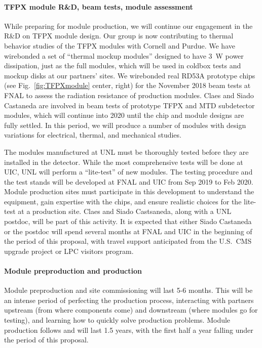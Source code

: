 \paragraph{TFPX module R\&D, beam tests, module assessment}
While preparing for module production, we will continue our engagement in the R\&D on TFPX module design. Our group is now contributing to thermal behavior studies of the TFPX modules with Cornell and Purdue. We have wirebonded a set of ``thermal mockup modules'' designed to have 3~W power dissipation, just as the full modules, which will be used in coldbox tests and mockup disks at our partners' sites. We wirebonded real RD53A prototype chips (see Fig.~\ref{fig:TFPXmodule} center, right) for the November 2018 beam tests at FNAL to assess the radiation resistance of production modules.  
Claes and Siado Castaneda are involved in beam tests of prototype TFPX and MTD subdetector modules, which will continue into 2020 until the chip and module designs are fully settled. In this period, we will produce a number of modules with design variations for electrical, thermal, and mechanical studies.

The modules manufactured at UNL must be thoroughly tested before they are installed in the detector. While the most comprehensive tests will be done at UIC, UNL will perform a ``lite-test'' of new modules. The testing procedure and the test stands will be developed at FNAL and UIC from Sep 2019 to Feb 2020. Module production sites must participate in this development to understand the equipment, gain expertise with the chips, and ensure realistic choices for the lite-test at a production site. Claes and Siado Castsaneda, along with a UNL postdoc, will be part of this activity. It is expected that either Siado Castaneda or the postdoc will spend several months at FNAL and UIC in the beginning of the period of this proposal, with travel support anticipated from the U.S.~CMS upgrade project or LPC visitors program.

\paragraph{Module preproduction and production}

Module preproduction and site commissioning will last 5-6 months. 
This will be an intense period of perfecting the production process, interacting with partners upstream (from where components come) and downstream (where modules go for testing), and learning how to quickly solve production problems. 
Module production follows and will last 1.5 years, with the first half a year falling under the period of this proposal.  

